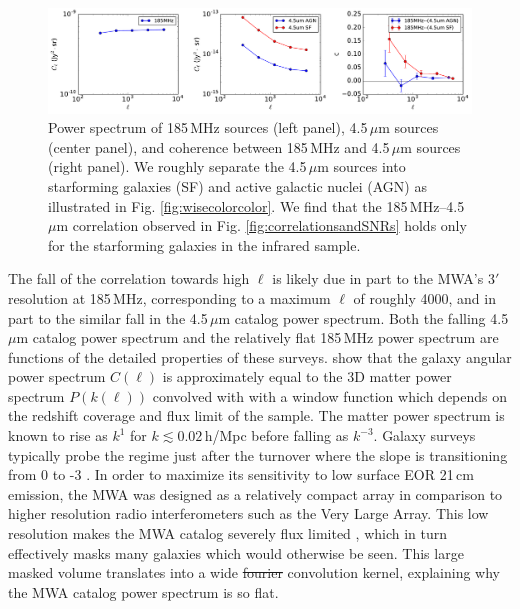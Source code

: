 \documentclass[numberedappendix]{emulateapj}
\providecommand{\DIFadd}[1]{{\protect\color{blue}\uwave{#1}}} %
\providecommand{\DIFdel}[1]{{\protect\color{red}\sout{#1}}}                      %
\providecommand{\DIFaddbegin}{} %
\providecommand{\DIFaddend}{} %
\providecommand{\DIFdelbegin}{} %
\providecommand{\DIFdelend}{} %
\providecommand{\DIFaddbeginFL}{} %
\providecommand{\DIFaddendFL}{} %
\providecommand{\DIFdelbeginFL}{} %
\providecommand{\DIFdelendFL}{} %
\begin{document}
\begin{figure}[h]
\centering
\DIFdelbeginFL %
\DIFdelendFL \DIFaddbeginFL \includegraphics[width=7in]{chap5_xcor/mwa_wise_qsoagn_gal_xspec.pdf}
\DIFaddendFL \caption[Auto and cross spectra of 185\,MHz and 4.5\,$\mu$m sources, for both AGN and SF cuts of the infrared catalog.]{Power spectrum of 185\,MHz sources (left panel), 4.5\,$\mu$m sources (center panel), and coherence between 185\,MHz and 4.5\,$\mu$m sources (right panel). We roughly separate the 4.5\,$\mu$m sources into starforming galaxies (SF) and active galactic nuclei (AGN) as illustrated in Fig.  \ref{fig:wisecolorcolor}. We find that the 185\,MHz--4.5\,$\mu$m correlation observed in Fig. \ref{fig:correlationsandSNRs} holds only for the starforming galaxies in the infrared sample. }
\label{fig:wisexspec}
\end{figure}

The fall of the correlation towards high $\ell$ is likely due in part to the MWA's $3'$ resolution at 185\,MHz, corresponding to a maximum $\ell$ of roughly 4000, and in part to the similar fall in the 4.5\,$\mu$m catalog power spectrum. Both the falling 4.5\,$\mu$m catalog power spectrum and the relatively flat 185\,MHz power spectrum are functions of the detailed properties of these surveys. \citet{tegmark02,dodelson02} show that the galaxy angular power spectrum $C(\ell)$ is approximately equal to the 3D matter power spectrum $P(k(\ell))$ convolved with with a window function which depends on the redshift coverage and flux limit of the sample. The matter power spectrum is known to rise as $k^{1}$ for $k\lesssim0.02$\,h/Mpc before falling as $k^{-3}$. Galaxy surveys typically probe the regime just after the turnover where the slope is transitioning from 0 to -3 \citep{tegmark02b}. In order to maximize its sensitivity to low surface EOR 21\,cm emission, the MWA was designed as a relatively compact array in comparison to higher resolution radio interferometers such as the Very Large Array. This low resolution makes the MWA catalog severely flux limited \citep{PattiCatalog1}, which in turn effectively masks many galaxies which would otherwise be seen. This large masked volume translates into a wide \DIFdelbegin \DIFdel{fourier }\DIFdelend \DIFaddbegin \DIFadd{Fourier }\DIFaddend convolution kernel, explaining why the MWA catalog power spectrum is so flat. 
\end{document}
